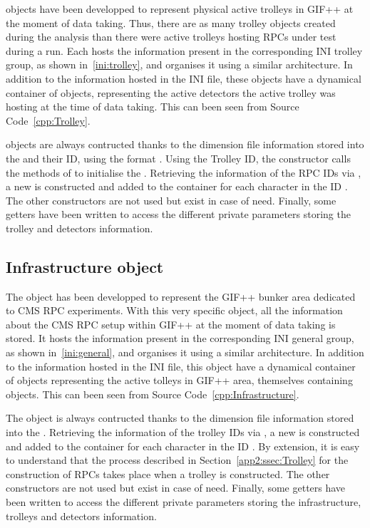 	 objects have been developped to represent physical active trolleys in GIF++ at the moment of data taking. Thus, there are as many trolley objects created during the analysis than there were active trolleys hosting RPCs under test during a run. Each  hosts the information present in the corresponding INI trolley group, as shown in~\ref{ini:trolley}, and organises it using a similar architecture. In addition to the information hosted in the INI file, these objects have a dynamical container of  objects, representing the active detectors the active trolley was hosting at the time of data taking. This can been seen from Source Code~\ref{cpp:Trolley}.
	
	 objects are always contructed thanks to the dimension file information stored into the  and their ID, using the format . Using the Trolley ID, the constructor calls the methods of  to initialise the . Retrieving the information of the RPC IDs via , a new  is constructed and added to the container  for each character in the ID . The other constructors are not used but exist in case of need. Finally, some getters have been written to access the different private parameters storing the trolley and detectors information.\\
	
	\subsection{Infrastructure object}
	\label{app2:ssec:Infra}
	
	The  object has been developped to represent the GIF++ bunker area dedicated to CMS RPC experiments. With this very specific object, all the information about the CMS RPC setup within GIF++ at the moment of data taking is stored. It hosts the information present in the corresponding INI general group, as shown in~\ref{ini:general}, and organises it using a similar architecture. In addition to the information hosted in the INI file, this object have a dynamical container of  objects representing the active tolleys in GIF++ area, themselves containing  objects. This can been seen from Source Code~\ref{cpp:Infrastructure}.
	
	The  object is always contructed thanks to the dimension file information stored into the . Retrieving the information of the trolley IDs via , a new  is constructed and added to the container  for each character in the ID . By extension, it is easy to understand that the process described in Section~\ref{app2:ssec:Trolley} for the construction of RPCs takes place when a trolley is constructed. The other constructors are not used but exist in case of need. Finally, some getters have been written to access the different private parameters storing the infrastructure, trolleys and detectors information.\\
	
